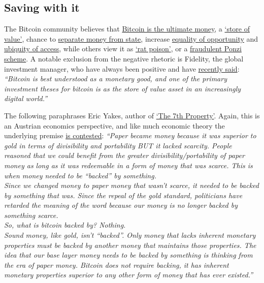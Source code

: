 \subsection{Saving with it} 
The Bitcoin community believes that \href{https://svetski.medium.com/why-bitcoin-not-shitcoin-6cc826f4fa52}{Bitcoin is the ultimate money}, a \href{https://www.coindesk.com/business/2022/01/07/jpmorgan-sees-more-crypto-adoption-in-2022-debates-bitcoins-status-as-store-of-value/}{`store of value'}, chance to \href{https://www.forbes.com/sites/leeorshimron/2020/06/30/bitcoin-is-the-separation-of-money-and-state/?sh=49294a8356db}{separate money from state}, increase \href{https://www.washingtonpost.com/national/locked-out-of-traditional-financial-industry-more-people-of-color-are-turning-to-cryptocurrency/2021/12/01/a21df3fa-37fe-11ec-9bc4-86107e7b0ab1_story.html}{equality of opportunity} and \href{https://iai.tv/articles/the-rich-get-richer-the-poor-get-bitcoin-auid-1766}{ubiquity of access}, while others view it as \href{https://www.cnbc.com/2021/06/22/a-third-of-investors-think-bitcoin-is-rat-poison-jpmorgan-survey-says.html}{`rat poison'}, or a \href{https://jacobinmag.com/2022/01/cryptocurrency-scam-blockchain-bitcoin-economy-decentralization}{fraudulent Ponzi scheme}. A notable exclusion from the negative rhetoric is Fidelity, the global investment manager, who have always been positive and have \href{https://www.fidelitydigitalassets.com/articles/bitcoin-first?sf253214177=1}{recently said}: 
\textit{``Bitcoin is best understood as a monetary good, and one of the primary investment theses for bitcoin is as the store of value asset in an increasingly digital world.''}\par
The following paraphrases Eric Yakes, author of \href{https://yakes.io/book/}{`The 7th Property'}. Again, this is an Austrian economics perspective, and like much economic theory the underlying premise \href{https://medium.datadriveninvestor.com/do-you-understand-the-austrian-vs-keynesian-economic-debate-2f4b152c6a6b}{is contested}\cite{maurel2012keynesian}: \textit{``Paper became money because it was superior to gold in terms of divisibility and portability BUT it lacked scarcity. People reasoned that we could benefit from the greater divisibility/portability of paper money as long as it was redeemable in a form of money that was scarce. This is when money needed to be ``backed'' by something. \\
Since we changed money to paper money that wasn't scarce, it needed to be backed by something that was. Since the repeal of the gold standard, politicians have retarded the meaning of the word because our money is no longer backed by something scarce.\\
So, what is bitcoin backed by? Nothing.\\
Sound money, like gold, isn’t ``backed''.
Only money that lacks inherent monetary properties must be backed by another money that maintains those properties. The idea that our base layer money needs to be backed by something is thinking from the era of paper money. Bitcoin does not require backing, it has inherent monetary properties superior to any other form of money that has ever existed.''}\par
